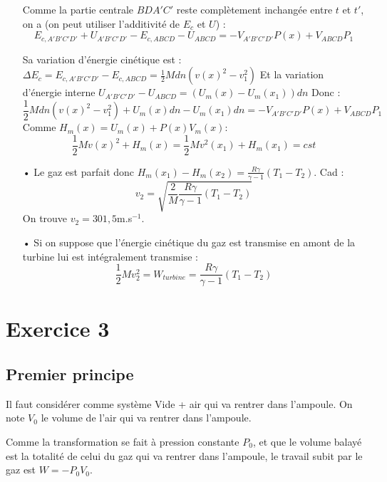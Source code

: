 \documentclass{report}
\begin{document}
\begin{itemize}
Comme la partie centrale $BDA'C'$ reste complètement inchangée entre $t$ et $t'$, on a (on peut utiliser l'additivité de $E_c$ et $U$) : 
\begin{equation}
	E_{c,A'B'C'D'} + U_{A'B'C'D'} - E_{c,ABCD} - U_{ABCD}  = -V_{A'B'C'D'}P(x)+V_{ABCD}P_1
\end{equation}

Sa variation d'énergie cinétique est :
 $\Delta E_c =  E_{c,A'B'C'D'} - E_{c,ABCD} = \frac{1}{2}Mdn\left(v(x)^2-v_1^2\right) $
Et la variation d'énergie interne $U_{A'B'C'D'} - U_{ABCD}=(U_m(x) - U_m(x_1))dn$
Donc : 
	\begin{equation}
	\frac{1}{2}Mdn\left(v(x)^2-v_1^2\right) + U_m(x)dn - U_m(x_1)dn = -V_{A'B'C'D'}P(x)+V_{ABCD}P_1
\end{equation}
Comme $H_m(x) = U_m(x)+P(x)V_m(x)$:
	\begin{equation}
	\frac{1}{2}M v(x)^2+ H_m(x)  =\frac{1}{2}M v^2(x_1) + H_m(x_1) = cst
\end{equation}
\item[•] Le gaz est parfait donc $H_m(x_1)-H_m(x_2)=\frac{R\gamma}{\gamma-1}(T_1-T_2)$. Cad : 
\begin{equation}
	v_2=\sqrt{\frac{2}{M}\frac{R\gamma}{\gamma-1}(T_1-T_2)}
\end{equation}
On trouve $v_2=301,5$m.s$^{-1}$.
\item[•] Si on suppose que l'énergie cinétique du gaz est transmise en amont de la turbine lui est intégralement transmise :
\begin{equation}
	\frac{1}{2}Mv_2^2=W_{turbine} = \frac{R\gamma}{\gamma-1}(T_1-T_2)
\end{equation}
\end{itemize}

\section*{Exercice 3}

\subsection*{Premier principe}

Il faut considérer comme système {Vide + air qui va rentrer dans l'ampoule}. On note $V_0$ le volume de l'air qui va rentrer dans l'ampoule.

Comme la transformation se fait à pression constante $P_0$, et que le volume balayé est la totalité de celui du gaz qui va rentrer dans l'ampoule, le travail subit par le gaz est $W = - P_0V_0$.
\end{document}

